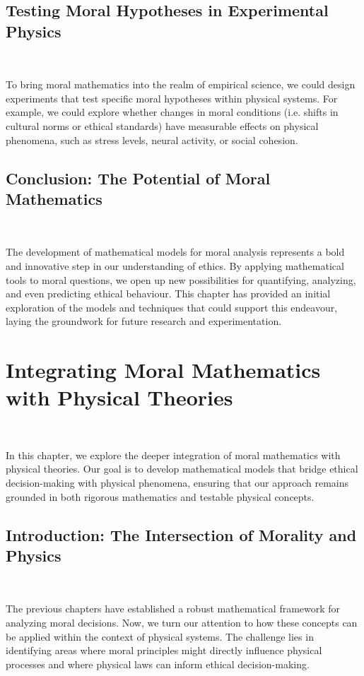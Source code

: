 \documentclass{article}
\begin{document}
\subsection{Testing Moral Hypotheses in Experimental Physics}
\

To bring moral mathematics into the realm of empirical science, we could design experiments that test specific moral hypotheses within physical systems. For example, we could explore whether changes in moral conditions (i.e. shifts in cultural norms or ethical standards) have measurable effects on physical phenomena, such as stress levels, neural activity, or social cohesion.
\\

\subsection{Conclusion: The Potential of Moral Mathematics}
\

The development of mathematical models for moral analysis represents a bold and innovative step in our understanding of ethics. By applying mathematical tools to moral questions, we open up new possibilities for quantifying, analyzing, and even predicting ethical behaviour. This chapter has provided an initial exploration of the models and techniques that could support this endeavour, laying the groundwork for future research and experimentation.


\section{Integrating Moral Mathematics with Physical Theories}
\

In this chapter, we explore the deeper integration of moral mathematics with physical theories. Our goal is to develop mathematical models that bridge ethical decision-making with physical phenomena, ensuring that our approach remains grounded in both rigorous mathematics and testable physical concepts.
\\

\subsection{Introduction: The Intersection of Morality and Physics}
\

The previous chapters have established a robust mathematical framework for analyzing moral decisions. Now, we turn our attention to how these concepts can be applied within the context of physical systems. The challenge lies in identifying areas where moral principles might directly influence physical processes and where physical laws can inform ethical decision-making.
\\
\end{document}
